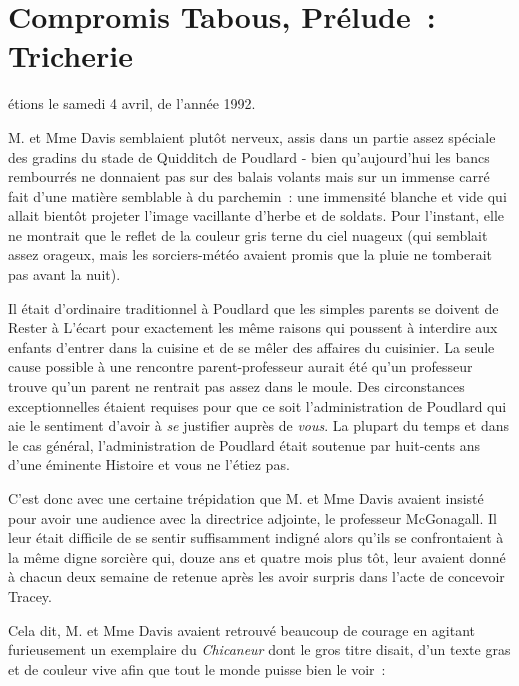 \chapter{Compromis Tabous, Prélude~: Tricherie}

 étions le samedi 4 avril, de l'année 1992.

\hplettrineextrapara
M. et Mme Davis semblaient plutôt nerveux, assis dans un partie assez spéciale des gradins du stade de Quidditch de Poudlard - bien qu'aujourd'hui les bancs rembourrés ne donnaient pas sur des balais volants mais sur un immense carré fait d'une matière semblable à du parchemin~: une immensité blanche et vide qui allait bientôt projeter l'image vacillante d'herbe et de soldats. Pour l'instant, elle ne montrait que le reflet de la couleur gris terne du ciel nuageux (qui semblait assez orageux, mais les sorciers-météo avaient promis que la pluie ne tomberait pas avant la nuit).

Il était d'ordinaire traditionnel à Poudlard que les simples parents se doivent de Rester à L'écart pour exactement les même raisons qui poussent à interdire aux enfants d'entrer dans la cuisine et de se mêler des affaires du cuisinier. La seule cause possible à une rencontre parent-professeur aurait été qu'un professeur trouve qu'un parent ne rentrait pas assez dans le moule. Des circonstances exceptionnelles étaient requises pour que ce soit l'administration de Poudlard qui aie le sentiment d'avoir à \emph{se} justifier auprès de \emph{vous}. La plupart du temps et dans le cas général, l'administration de Poudlard était soutenue par huit-cents ans d'une éminente Histoire et vous ne l'étiez pas.

C'est donc avec une certaine trépidation que M. et Mme Davis avaient insisté pour avoir une audience avec la directrice adjointe, le professeur McGonagall. Il leur était difficile de se sentir suffisamment indigné alors qu'ils se confrontaient à la même digne sorcière qui, douze ans et quatre mois plus tôt, leur avaient donné à chacun deux semaine de retenue après les avoir surpris dans l'acte de concevoir Tracey.

Cela dit, M. et Mme Davis avaient retrouvé beaucoup de courage en agitant furieusement un exemplaire du \emph{Chicaneur} dont le gros titre disait, d'un texte gras et de couleur vive afin que tout le monde puisse bien le voir~:


